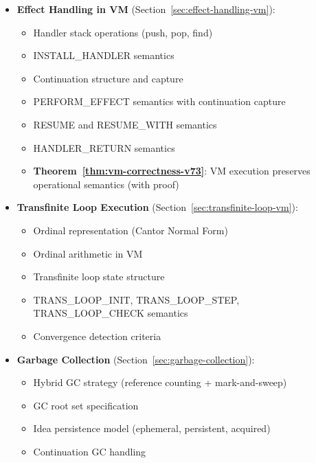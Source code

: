 \begin{tcolorbox}[colback=green!5!white,colframe=green!50!black,title=\textbf{Handoff: COMPILER-TASK-05 Complete},breakable]
\begin{itemize}
    \begin{itemize}
      \item RPM state structure with acquisition set, goals, prerequisites, history
      \item Prerequisite graph encoding TKS progression rules
      \item RPM\_CHECK, RPM\_ACQUIRE, RPM\_BIND semantics
      \item Goal management instructions and example
    \end{itemize}
  \item \textbf{Effect Handling in VM} (Section~\ref{sec:effect-handling-vm}):
    \begin{itemize}
      \item Handler stack operations (push, pop, find)
      \item INSTALL\_HANDLER semantics
      \item Continuation structure and capture
      \item PERFORM\_EFFECT semantics with continuation capture
      \item RESUME and RESUME\_WITH semantics
      \item HANDLER\_RETURN semantics
      \item \textbf{Theorem~\ref{thm:vm-correctness-v73}}: VM execution preserves operational semantics (with proof)
    \end{itemize}
  \item \textbf{Transfinite Loop Execution} (Section~\ref{sec:transfinite-loop-vm}):
    \begin{itemize}
      \item Ordinal representation (Cantor Normal Form)
      \item Ordinal arithmetic in VM
      \item Transfinite loop state structure
      \item TRANS\_LOOP\_INIT, TRANS\_LOOP\_STEP, TRANS\_LOOP\_CHECK semantics
      \item Convergence detection criteria
    \end{itemize}
  \item \textbf{Garbage Collection} (Section~\ref{sec:garbage-collection}):
    \begin{itemize}
      \item Hybrid GC strategy (reference counting + mark-and-sweep)
      \item GC root set specification
      \item Idea persistence model (ephemeral, persistent, acquired)
      \item Continuation GC handling
    \end{itemize}
\end{itemize}


\end{tcolorbox}

